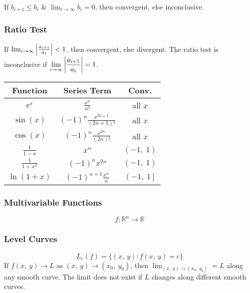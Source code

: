 \documentclass{article}
\begin{document}
\begin{multicols}{3}
    If $b_{i+1}\leqslant b_i$ \& $\lim_{i\to\infty}b_i=0$, then
    convergent, else inconclusive.
    \subsubsection*{Ratio Test}
    If $\lim_{i\to\infty}\abs{\frac{a_{i+1}}{a_i}} < 1$,
    then convergent, else divergent. The ratio test is inconclusive if
    $\displaystyle \lim_{i\to\infty}\abs{\frac{a_{i+1}}{a_i}} = 1$.
    \begin{table}[H]
        \centering
        \begin{tabular}{c | c | c}
            \toprule
            \textbf{Function}         & \textbf{Series Term}                                        & \textbf{Conv.}           \\
            \midrule
            $e^{x}$                  & $\frac{x^n}{n!}$                                            & all $x$                  \\
            $\sin{\left( x \right)}$  & $\left( -1 \right)^n \frac{x^{2n+1}}{\left( 2n+1 \right)!}$ & all $x$                  \\
            $\cos{\left( x \right)}$  & $\left( -1 \right)^n \frac{x^{2n}}{\left( 2n \right)!}$     & all $x$                  \\
            $\frac{1}{1-x}$           & $x^n$                                                       & $\left( -1,\: 1 \right)$ \\
            $\frac{1}{1+x^2}$         & $\left( -1 \right)^n x^{2n}$                                & $\left( -1,\: 1 \right)$ \\
            $\ln{\left( 1+x \right)}$ & $\left( -1 \right)^{n+1} \frac{x^n}{n}$                     & $\left( -1,\: 1 \right]$ \\
            \bottomrule
        \end{tabular}
    \end{table}
    \subsubsection*{Multivariable Functions}
    \begin{equation*}
        f:\mathbb{R}^n\to\mathbb{R}
    \end{equation*}
    \subsubsection*{Level Curves}
    \begin{equation*}
        L_c\left( f \right) = \bigl\{ \left( x,\: y \right) : f\left(x,\: y\right) = c\bigr\}
    \end{equation*}
    If $f(x,\: y) \to L$ as $(x,\: y) \to (x_0,\: y_0)$, then
    $\displaystyle \lim_{(x,\: y) \to (x_0,\: y_0)} = L$ along any smooth
    curve. The limit does not exist if $L$ changes along different smooth curves.


\end{multicols}
\end{document}
